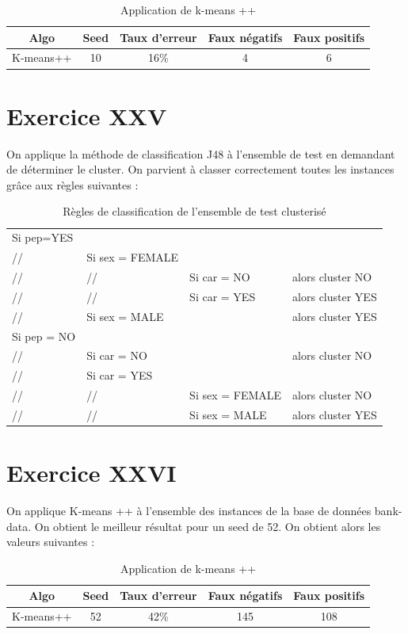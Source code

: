 \documentclass[a4paper, 11pt]{report}
\begin{document}
        \begin{table}[h!]
        \centering
        \begin{tabular}{| c | c | c | c | c |}
        \hline
         Algo & Seed & Taux d'erreur & Faux négatifs & Faux positifs  \\
         \hline
         K-means++ & 10 & 16\% & 4 & 6 \\
         \hline
        \end{tabular}
        \caption{Application de k-means ++}
        \label{tab:exo24}
        \end{table}
        
        \section{Exercice XXV}
        On applique la méthode de classification J48 à l'ensemble de test en demandant de déterminer le cluster. On parvient à classer correctement toutes les instances grâce aux règles suivantes : 
        \begin{table}[h!]
        \centering
        \begin{tabular}{l l l l}
        Si pep=YES & & & \\
         // & Si sex = FEMALE & & \\
         // & // & Si car = NO & alors cluster NO \\
         // & // & Si car = YES & alors cluster YES \\
         // & Si sex = MALE & & alors cluster YES \\
        Si pep = NO & & & \\
         // & Si car = NO & & alors cluster NO \\
         // & Si car = YES & & \\
         // & // & Si sex = FEMALE & alors cluster NO \\
         // & // & Si sex = MALE & alors cluster YES\\
        \end{tabular}
        \caption{Règles de classification de l'ensemble de test clusterisé}
        \label{tab:exo25}
        \end{table}
        
        \section{Exercice XXVI}
        On applique K-means ++ à l'ensemble des instances de la base de données bank-data.
        On obtient le meilleur résultat pour un seed de 52. On obtient alors les valeurs suivantes :
        \begin{table}[h!]
        \centering
        \begin{tabular}{| c | c | c | c | c |}
        \hline
         Algo & Seed & Taux d'erreur & Faux négatifs & Faux positifs  \\
         \hline
         K-means++ & 52 & 42\% & 145 & 108 \\
         \hline
        \end{tabular}
        \caption{Application de k-means ++}
        \label{tab:exo26}
        \end{table}
        
\end{document}
